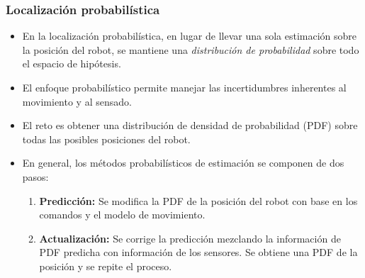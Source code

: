 \begin{frame}\frametitle{Localización probabilística}
  \begin{itemize}
  \item En la localización probabilística, en lugar de llevar una sola estimación sobre la posición del robot, se mantiene una \textit{distribución de probabilidad} sobre todo el espacio de hipótesis.
  \item El enfoque probabilístico permite manejar las incertidumbres inherentes al movimiento y al sensado.
  \item El reto es obtener una distribución de densidad de probabilidad (PDF) sobre todas las posibles posiciones del robot.
  \item En general, los métodos probabilísticos de estimación se componen de dos pasos:
    \begin{enumerate}
    \item \textbf{Predicción:} Se modifica la PDF de la posición del robot con base en los comandos y el modelo de movimiento.
    \item \textbf{Actualización:} Se corrige la predicción mezclando la información de PDF predicha con información de los sensores. Se obtiene una PDF de la posición y se repite el proceso. 
    \end{enumerate}
  \end{itemize}  
\end{frame}

